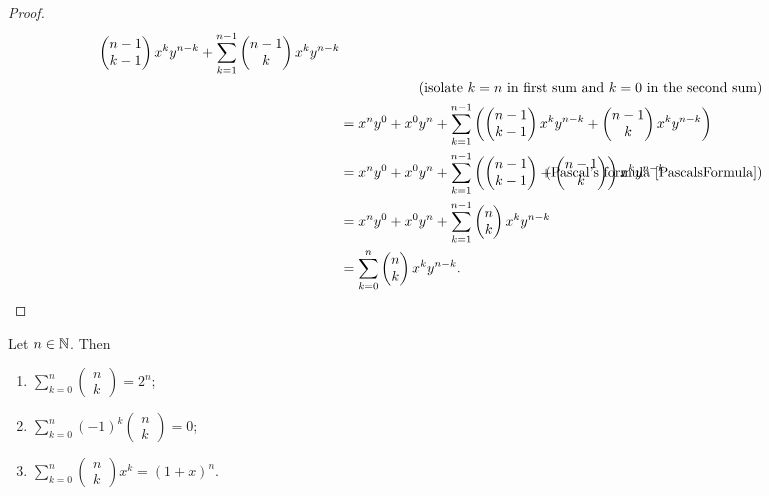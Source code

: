 \begin{proof}
\begin{align*}
\begin{pmatrix}
n-1 \\ k-1
\end{pmatrix}x^{k} y^{n-k} + \sum_{k=1}^{n-1} \begin{pmatrix}
n-1 \\ k
\end{pmatrix}x^{k} y^{n-k} \\
&&\hspace{-22em}\text{(isolate $k=n$ in first sum and $k=0$ in the second sum)}& \\
&= x^ny^{0} + x^0y^n + \sum_{k=1}^{n-1} \left(\begin{pmatrix}
n-1 \\ k-1
\end{pmatrix}x^{k} y^{n-k} + \begin{pmatrix}
n-1 \\ k
\end{pmatrix}x^{k} y^{n-k}\right) \\
&= x^ny^{0} + x^0y^n + \sum_{k=1}^{n-1} \left(\begin{pmatrix}
n-1 \\ k-1
\end{pmatrix} + \begin{pmatrix}
n-1 \\ k
\end{pmatrix}\right)x^{k} y^{n-k} &\hspace{-22em}\text{(Pascal's formula \ref{PascalsFormula})}& \\
&= x^ny^{0} + x^0y^n + \sum_{k=1}^{n-1} \begin{pmatrix}
n \\ k
\end{pmatrix}x^{k} y^{n-k} \\
&= \sum_{k=0}^{n} \begin{pmatrix}
n \\ k
\end{pmatrix}x^{k} y^{n-k}.
\end{align*}
\end{proof}
\begin{corollary} \label{consequencesBinomialIdentity}
Let $n\in \mathbb{N}$. Then
\begin{enumerate}
\item $\sum_{k=0}^n \begin{pmatrix}
n \\ k
\end{pmatrix} = 2^n$;
\item $\sum_{k=0}^n (-1)^k\begin{pmatrix}
n \\ k
\end{pmatrix} = 0$;
\item $\sum_{k=0}^n \begin{pmatrix}
n \\ k
\end{pmatrix}x^k = (1+x)^n$.
\end{enumerate}
\end{corollary}
